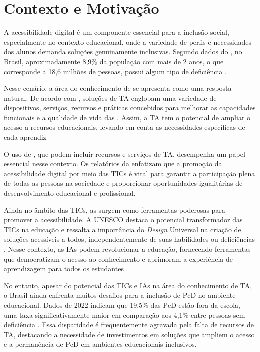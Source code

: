 \section{Contexto e Motivação}

A acessibilidade digital é um componente essencial para a inclusão social, especialmente no contexto educacional, onde a variedade de perfis e necessidades dos alunos demanda soluções genuinamente inclusivas. Segundo dados do , no Brasil, aproximadamente 8,9\% da população com mais de 2 anos, o que corresponde a 18,6 milhões de pessoas, possui algum tipo de deficiência \cite{IBGE2023}.

Nesse cenário, a área do conhecimento de  se apresenta como uma resposta natural. De acordo com , soluções de TA englobam uma variedade de dispositivos, serviços, recursos e práticas concebidos para melhorar as capacidades funcionais e a qualidade de vida das . Assim, a TA tem o potencial de ampliar o acesso a recursos educacionais, levando em conta as necessidades específicas de cada aprendiz \cite{UNESCO2023, GovBr2023}

O uso de , que podem incluir recursos e serviços de TA, desempenha um papel essencial nesse contexto. Os relatórios da  enfatizam que a promoção da acessibilidade digital por meio das TICs é vital para garantir a participação plena de todas as pessoas na sociedade e proporcionar oportunidades igualitárias de desenvolvimento educacional e profissional.


Ainda no âmbito das TICs, as  surgem como ferramentas poderosas para promover a acessibilidade. A UNESCO destaca o potencial transformador das TICs na educação e ressalta a importância do \textit{Design} Universal na criação de soluções acessíveis a todos, independentemente de suas habilidades ou deficiências \cite{UNESCO2023, GovBr2023}. Nesse contexto, as IAs podem revolucionar a educação, fornecendo ferramentas que democratizam o acesso ao conhecimento e aprimoram a experiência de aprendizagem para todos os estudantes \cite{Holmes2019,UNESCO2024}.

No entanto, apesar do potencial das TICs e IAs na área do conhecimento de TA, o Brasil ainda enfrenta muitos desafios para a inclusão de PcD no ambiente educacional. Dados de 2022 indicam que 19,5\% das PcD estão fora da escola, uma taxa significativamente maior em comparação aos 4,1\% entre pessoas sem deficiência \cite{IBGE2023}. Essa disparidade é frequentemente agravada pela falta de recursos de TA, destacando a necessidade de investimentos em soluções que ampliem o acesso e a permanência de PcD em ambientes educacionais inclusivos.

